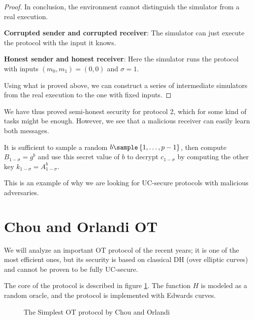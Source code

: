 \begin{proof}
    In conclusion, the environment cannot distinguish the simulator from a real execution.

    \textbf{Corrupted sender and corrupted receiver}: The simulator can just execute the protocol with the input it knows.

    \textbf{Honest sender and honest receiver}: Here the simulator runs the protocol with inputs $(m_0,m_1)=(0,0)$ and $\sigma=1$.

    Using what is proved above, we can construct a series of intermediate simulators from the real execution to the one with fixed inputs.
\end{proof}

We have thus proved semi-honest security for protocol 2, which for some kind of tasks might be enough. However, we see that a malicious receiver can easily learn both messages.

It is sufficient to sample a random $b\sample\set{1,\dots,p-1}$, then compute $B_{1-\sigma}=g^b$ and use this secret value of $b$ to decrypt $c_{1-\sigma}$ by computing the other key $k_{1-\sigma}=A_{1-\sigma}^b$.

This is an example of why we are looking for UC-secure protocols with malicious adversaries.



\section{Chou and Orlandi OT}

We will analyze an important OT protocol of the recent years; it is one of the most efficient ones, but its security is based on classical DH (over elliptic curves) and cannot be proven to be fully UC-secure.

The core of the protocol is described in figure \ref{prot_CO}. The function $H$ is modeled as a random oracle, and the protocol is implemented with Edwards curves.

\begin{figure}
    \caption{The Simplest OT protocol by Chou and Orlandi}
    \label{prot_CO}
\end{figure}



